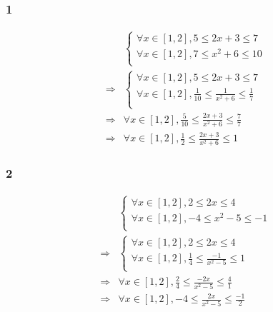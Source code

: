 \documentclass{report}
\begin{document}
\subsubsection*{1}
\begin{equation*}
	\begin{split}
	&\begin{cases}
		\forall x \in [1, 2], 5 \le 2x+3 \le 7 \\
		\forall x \in [1, 2], 7 \le x^2+6 \le 10 \\
	\end{cases} \\
	\Rightarrow
	&\begin{cases}
		\forall x \in [1, 2], 5 \le 2x+3 \le 7 \\
		\forall x \in [1, 2], \frac{1}{10} \le \frac{1}{x^2+6} \le \frac{1}{7} \\
	\end{cases} \\
	\Rightarrow
	& \forall x \in [1, 2], \frac{5}{10} \le \frac{2x+3}{x^2+6} \le \frac{7}{7} \\
	\Rightarrow
	&\forall x \in [1, 2], \frac{1}{2} \le \frac{2x+3}{x^2+6} \le 1
	\end{split}
\end{equation*}

\subsubsection*{2}
\begin{equation*}
	\begin{split}
		&\begin{cases}
			\forall x \in [1, 2], 2 \le 2x \le 4 \\
			\forall x \in [1, 2], -4 \le x^2-5 \le -1 \\
		\end{cases} \\
		\Rightarrow
		&\begin{cases}
			\forall x \in [1, 2], 2 \le 2x \le 4 \\
			\forall x \in [1, 2], \frac{1}{4} \le \frac{-1}{x^2-5} \le 1 \\
		\end{cases} \\
		\Rightarrow
		& \forall x \in [1, 2], \frac{2}{4} \le \frac{-2x}{x^2-5} \le \frac{4}{1} \\
		\Rightarrow
		& \forall x \in [1, 2], -4 \le \frac{2x}{x^2-5} \le \frac{-1}{2} \\
	\end{split}
\end{equation*}
\end{document}
